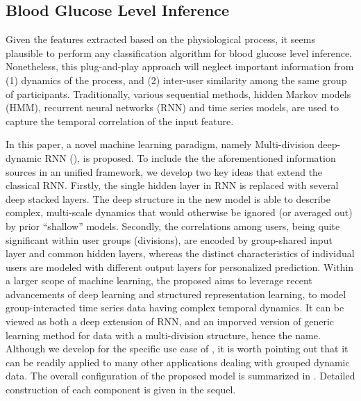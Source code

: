\subsection{Blood Glucose Level Inference}
Given the features extracted based on the physiological process, it seems plausible to perform any classification algorithm for blood glucose level inference.
Nonetheless, this plug-and-play approach will neglect important information from (1) dynamics of the process, and (2) inter-user similarity among the same group of participants.
Traditionally, various sequential methods, \eg hidden Markov models (HMM), recurrent neural networks (RNN) and time series models, are used to capture the temporal correlation of the input feature.

In this paper, a novel machine learning paradigm, namely Multi-division deep-dynamic RNN (\modelname), is proposed.
To include the the aforementioned information sources in an unified framework, we develop two key ideas that extend the classical RNN.
Firstly, the single hidden layer in RNN is replaced with several deep stacked layers.
The deep structure in the new model is able to describe complex, multi-scale dynamics that would otherwise be ignored (or averaged out) by prior ``shallow'' models.
Secondly, the correlations among users, being quite significant within user groups (divisions), are encoded by group-shared input layer and common hidden layers, whereas the distinct characteristics of individual users are modeled with different output layers for personalized prediction.
Within a larger scope of machine learning, the proposed \modelname aims to leverage recent advancements of deep learning and structured representation learning, to model group-interacted time series data having complex temporal dynamics.
It can be viewed as both a deep extension of RNN, and an imporved version of generic learning method for data with a multi-division structure, hence the name.
Although we develop \modelname for the specific use case of \sysname, it is worth pointing out that it can be readily applied to many other applications dealing with grouped dynamic data.
The overall configuration of the proposed model is summarized in .
Detailed construction of each component is given in the sequel.

